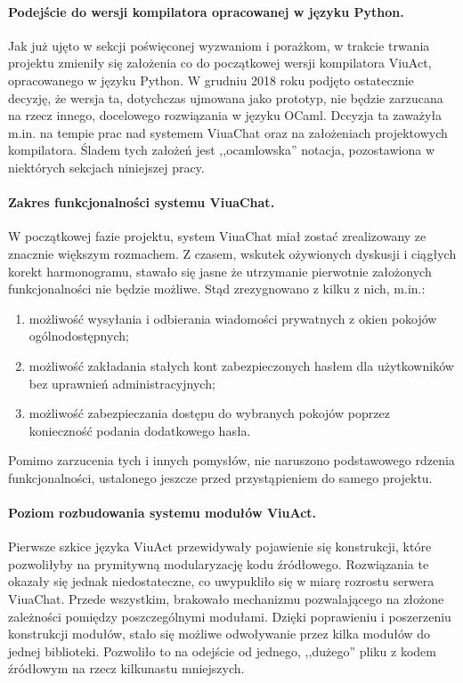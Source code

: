 \paragraph*{Podejście do wersji kompilatora opracowanej w języku Python.}
Jak już ujęto w sekcji poświęconej wyzwaniom i porażkom, w trakcie trwania
projektu zmieniły się założenia co do początkowej wersji kompilatora ViuAct,
opracowanego w języku Python. W grudniu 2018 roku podjęto ostatecznie decyzję,
że wersja ta, dotychczas ujmowana jako prototyp, nie będzie zarzucana na rzecz
innego, docelowego rozwiązania w języku OCaml. Dccyzja ta zaważyła m.in. na
tempie prac nad systemem ViuaChat oraz na założeniach projektowych kompilatora.
Śladem tych założeń jest ,,ocamlowska'' notacja, pozostawiona w niektórych sekcjach niniejszej pracy.

\paragraph*{Zakres funkcjonalności systemu ViuaChat.}
W początkowej fazie projektu, system ViuaChat miał zostać zrealizowany ze
znacznie większym rozmachem. Z czasem, wskutek ożywionych dyskusji i ciągłych
korekt harmonogramu, stawało się jasne że utrzymanie pierwotnie założonych
funkcjonalności nie będzie możliwe. Stąd zrezygnowano z kilku z nich, m.in.:

\begin{enumerate}
  \item możliwość wysyłania i odbierania wiadomości prywatnych z okien
  pokojów ogólnodostępnych;
  \item możliwość zakładania stałych kont zabezpieczonych hasłem dla użytkowników bez uprawnień administracyjnych;
  \item możliwość zabezpieczania dostępu do wybranych
  pokojów poprzez konieczność podania dodatkowego hasła.
\end{enumerate}

Pomimo zarzucenia tych i innych pomysłów, nie naruszono podstawowego rdzenia
funkcjonalności, ustalonego jeszcze przed przystąpieniem do samego projektu.

\paragraph*{Poziom rozbudowania systemu modułów ViuAct.}
Pierwsze szkice języka ViuAct przewidywały pojawienie się konstrukcji, które
pozwoliłyby na prymitywną modularyzację kodu źródłowego. Rozwiązania te okazały się jednak niedostateczne, co uwypukliło się w miarę rozrostu serwera
ViuaChat. Przede wszystkim, brakowało mechanizmu pozwalającego na złożone
zależności pomiędzy poszczególnymi modułami. Dzięki poprawieniu i poszerzeniu
konstrukcji modułów, stało się możliwe odwoływanie przez kilka modułów do jednej
biblioteki. Pozwoliło to na odejście od jednego, ,,dużego'' pliku z kodem
źródłowym na rzecz kilkunastu mniejszych.

